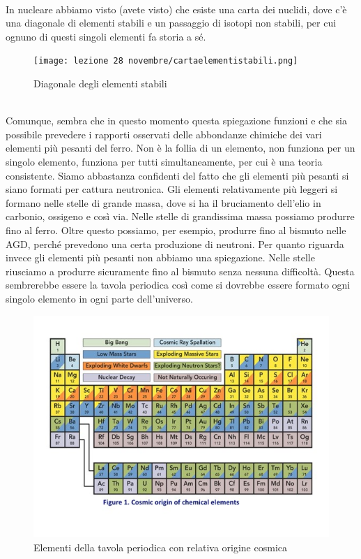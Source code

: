 \documentclass[a4paper,11pt]{article}
\begin{document}
    \\
    In nucleare abbiamo visto (avete visto) che esiste una carta dei nuclidi, dove c'è una diagonale di elementi stabili e un passaggio di isotopi non stabili, per cui ognuno di questi singoli elementi fa storia a sé. \\
    \begin{figure}[h!!]
        \centering
        \texttt{[image: lezione 28 novembre/cartaelementistabili.png]}
        \caption{Diagonale degli elementi stabili}
        \label{lezione 28 novembre/cartaelementistabili.png}
    \end{figure}
    \\
    Comunque, sembra che in questo momento questa spiegazione funzioni e che sia possibile prevedere i rapporti osservati delle abbondanze chimiche dei vari elementi più pesanti del ferro. Non è la follia di un elemento, non funziona per un singolo elemento, funziona per tutti simultaneamente, per cui è una teoria consistente. Siamo abbastanza confidenti del fatto che gli elementi più pesanti si siano formati per cattura neutronica. Gli elementi relativamente più leggeri si formano nelle stelle di grande massa, dove si ha il bruciamento dell'elio in carbonio, ossigeno e così via. Nelle stelle di grandissima massa possiamo produrre fino al ferro. Oltre questo possiamo, per esempio, produrre fino al bismuto nelle AGD, perché prevedono una certa produzione di neutroni. Per quanto riguarda invece gli elementi più pesanti non abbiamo una spiegazione. Nelle stelle riusciamo a produrre sicuramente fino al bismuto senza nessuna difficoltà. Questa sembrerebbe essere la tavola periodica così come si dovrebbe essere formato ogni singolo elemento in ogni parte dell'universo.
    \\
    \begin{figure}[h!!]
        \centering
        \includegraphics[width=12cm]{lezione 28 novembre/tavolaperiodica.jpg}
        \caption{Elementi della tavola periodica con relativa origine cosmica}
        \label{lezione 28 novembre/tavolaperiodica.jpg}
    \end{figure}
    
\end{document}
